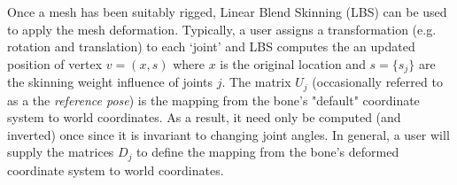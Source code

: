 


Once a mesh has been suitably rigged, Linear Blend Skinning (LBS) can be used to apply the mesh deformation. Typically, a user assigns a transformation (e.g. rotation and translation) to each `joint' and LBS computes the an updated position of vertex $v = (x, s)$ where $x$ is the original location and $s = \{s_j\}$ are the skinning weight influence of joints $j$. The matrix $U_{j}$ (occasionally referred to as a the \emph{reference pose}) is the mapping from the bone's "default" coordinate system to world coordinates. As a result, it need only be computed (and inverted) once since it is invariant to changing joint angles. In general, a user will supply the matrices $D_{j}$ to define the mapping from the bone's deformed coordinate system to world coordinates.

